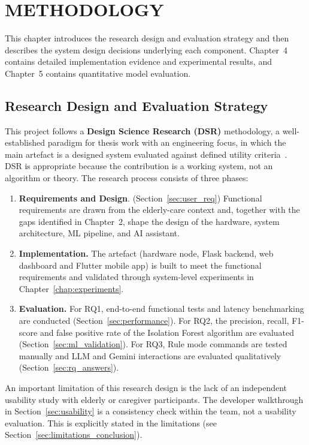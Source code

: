 \chapter{METHODOLOGY}

This chapter introduces the research design and evaluation strategy and then describes the system design decisions underlying each component. Chapter~4 contains detailed implementation evidence and experimental results, and Chapter~5 contains quantitative model evaluation.
\section{Research Design and Evaluation Strategy}
\label{sec:research_design}

This project follows a \textbf{Design Science Research (DSR)} methodology, a well-established paradigm for thesis work with an engineering focus, in which the main artefact is a designed system evaluated against defined utility criteria~\cite{Hevner2004}. DSR is appropriate because the contribution is a working system, not an algorithm or theory. The research process consists of three phases:

\begin{enumerate}
\item \textbf{Requirements and Design}. (Section~\ref{sec:user_req}) Functional requirements are drawn from the elderly-care context and, together with the gaps identified in Chapter~2, shape the design of the hardware, system architecture, ML pipeline, and AI assistant. \item \textbf{Implementation.}  The artefact (hardware node, Flask backend, web dashboard and Flutter mobile app) is built to meet the functional requirements and validated through system-level experiments in Chapter~\ref{chap:experiments}. \item \textbf{Evaluation.} For RQ1, end-to-end functional tests and latency benchmarking are conducted (Section~\ref{sec:performance}). For RQ2, the precision, recall, F1-score and false positive rate of the Isolation Forest algorithm are evaluated (Section~\ref{sec:ml_validation}). For RQ3, Rule mode commands are tested manually and LLM and Gemini interactions are evaluated qualitatively (Section~\ref{sec:rq_answers}).


\end{enumerate}

An important limitation of this research design is the lack of an independent usability study with elderly or caregiver participants. The developer walkthrough in Section~\ref{sec:usability} is a consistency check within the team, not a usability evaluation. This is explicitly stated in the limitations (see Section~\ref{sec:limitations_conclusion}).

